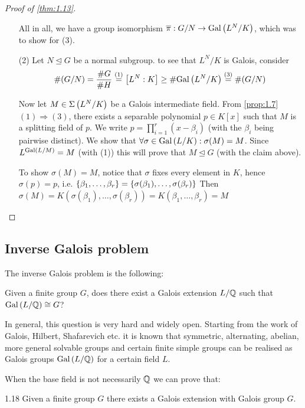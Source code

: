\documentclass[twoside = false,	%
		headsepline,		%
		parskip = true,
		]{scrbook}						%
\begin{document}
\begin{proof}[Proof of \ref{thm:1.13}]
\begin{enumerate}
            All in all, we have a group isomorphism $\overline\pi:G/N\to \mathrm{Gal}\left( L^N/K\right)$, which was to show for (3).
            
            \item[(2)]
            Let $N\trianglelefteq G$ be a normal subgroup. to see that $L^N/K$ is Galois, consider
            $$\#(G/N)= \frac{\#G}{\#H}\overset{(1)}=\left[ L^N:K\right]\geq\#\mathrm{Gal}\left( L^N/K\right)\overset{(3)} = \#(G/N)$$
            
            Now let $M\in\Sigma\left( L^N/K\right)$ be a Galois intermediate field. From \ref{prop:1.7} $(1)\Rightarrow(3)$, there exists a separable polynomial $p\in K[x]$ such that $M$ is a splitting field of $p$. We write $p=\prod_{i=1}^r(x-\beta_i)$ (with the $\beta_i$ being pairwise distinct). We show that $\forall\sigma \in\mathrm{Gal}\left( L/K\right): \sigma(M)=M$. Since $L^{\mathrm{Gal}\left( L/M\right)}=M$ (with (1)) this will prove that $M\trianglelefteq G$ (with the claim above).
            
            To show $\sigma(M)=M$, notice that $\sigma$ fixes every element in $K$, hence $\sigma(p)=p$, i.e. $\left\{ \beta_1,\dots,\beta_r\right\}=\left\{ \sigma(\beta_1),\dots,\sigma(\beta_r)\right\}$
            Then $\sigma(M)=K(\sigma(\beta_1),\dots,\sigma(\beta_r))=K(\beta_1,\dots,\beta_r)=M$
        \end{enumerate}
        \end{proof}
        
        
    \subsection{Inverse Galois problem}
        The inverse Galois problem is the following:
        
        Given a finite group $G$, does there exist a Galois extension $L/\mathbb Q$ such that $\mathrm{Gal}\left( L/\mathbb Q\right) \cong G$?
        
        In general, this question is very hard and widely open. Starting from the work of Galois, Hilbert, Shafarevich etc. it is known that symmetric, alternating, abelian, more general solvable groups and certain finite simple groups can be realised as Galois groups $\mathrm{Gal}\left( L/\mathbb Q\right)$ for a certain field $L$.
        
        When the base field is not necessarily $\mathbb Q$ we can prove that:
        
        \begin{corollary}{}{1.18}
            Given a finite group $G$ there exists a Galois extension with Galois group $G$.
        \end{corollary}
        
\end{document}
